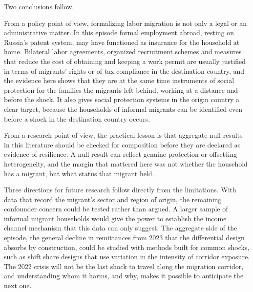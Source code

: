 Two conclusions follow.

From a policy point of view, formalizing labor migration is not only a legal or an administrative matter. In this episode formal employment abroad, resting on Russia's patent system, may have functioned as insurance for the household at home. Bilateral labor agreements, organized recruitment schemes and measures that reduce the cost of obtaining and keeping a work permit are usually justified in terms of migrants' rights or of tax compliance in the destination country, and the evidence here shows that they are at the same time instruments of social protection for the families the migrants left behind, working at a distance and before the shock. It also gives social protection systems in the origin country a clear target, because the households of informal migrants can be identified even before a shock in the destination country occurs.

From a research point of view, the practical lesson is that aggregate null results in this literature should be checked for composition before they are declared as evidence of resilience. A null result can reflect genuine protection or offsetting heterogeneity, and the margin that mattered here was not whether the household has a migrant, but what status that migrant held.

Three directions for future research follow directly from the limitations. With data that record the migrant's sector and region of origin, the remaining confounder concern could be tested rather than argued. A larger sample of informal migrant households would give the power to establish the income channel mechanism that this data can only suggest. The aggregate side of the episode, the general decline in remittances from 2023 that the differential design absorbs by construction, could be studied with methods built for common shocks, such as shift share designs that use variation in the intensity of corridor exposure. The 2022 crisis will not be the last shock to travel along the migration corridor, and understanding whom it harms, and why, makes it possible to anticipate the next one.